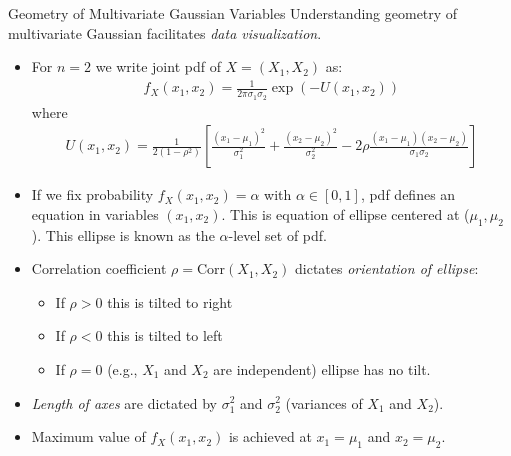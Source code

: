 \documentclass[9pt]{beamer}
\begin{document}
%
\begin{frame}{Geometry of Multivariate Gaussian Variables}
Understanding geometry of multivariate Gaussian facilitates {\em data visualization}.  

\begin{itemize}
\setlength{\itemsep}{5pt}
\item For $n=2$ we write joint pdf of $X=(X_1,X_2)$ as:
\begin{align*}
f_X(x_1,x_2)=\frac{1}{2\pi\sigma_1\sigma_2}\exp\left(-U(x_1,x_2)\right)
\end{align*}
where 
\begin{align*}
U(x_1,x_2)=\frac{1}{2(1-\rho^2)}\left[\frac{(x_1-\mu_1)^2}{\sigma_1^2}+\frac{(x_2-\mu_2)^2}{\sigma_2^2}-2\rho\frac{(x_1-\mu_1)(x_2-\mu_2)}{\sigma_1\sigma_2}\right]
\end{align*}

\item If we fix probability $f_X(x_1,x_2)=\alpha$ with $\alpha\in [0,1]$, pdf defines an equation in variables $(x_1,x_2)$.  This is equation of ellipse centered at ($\mu_1,\mu_2$).  This ellipse is known as the $\alpha$-level set of pdf.  

\item Correlation coefficient $\rho=\textrm{Corr}(X_1,X_2)$ dictates {\em orientation of ellipse}: 
\begin{itemize}
\item If $\rho>0$ this is tilted to right
\item If $\rho<0$ this is tilted to  left
\item If $\rho=0$ (e.g., $X_1$ and $X_2$ are independent) ellipse has no tilt. 
\end{itemize}
\item {\em Length of axes} are dictated by $\sigma_1^2$ and $\sigma_2^2$ (variances of $X_1$ and $X_2$).

\item Maximum value of $f_X(x_1,x_2)$ is achieved at $x_1=\mu_1$ and $x_2=\mu_2$. 

\end{itemize}

\end{frame}
\end{document}
